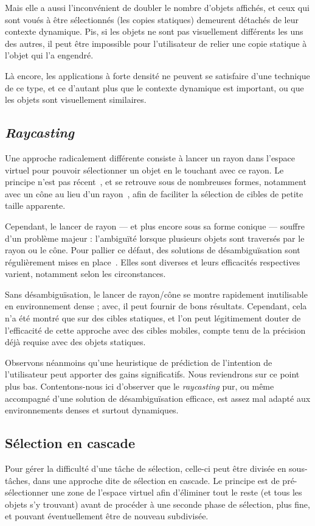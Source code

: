     Mais elle a aussi l'inconvénient de doubler le nombre d'objets affichés, et ceux qui sont voués à être sélectionnés (les copies statiques) demeurent détachés de leur contexte dynamique. Pis, si les objets ne sont pas visuellement différents les uns des autres, il peut être impossible pour l'utilisateur de relier une copie statique à l'objet qui l'a engendré.
    
    Là encore, les applications à forte densité ne peuvent se satisfaire d'une technique de ce type, et ce d'autant plus que le contexte dynamique est important, ou que les objets sont visuellement similaires.
    
    \subsection{\emph{Raycasting}}
    Une approche radicalement différente consiste à lancer un rayon dans l'espace virtuel pour pouvoir sélectionner un objet en le \og touchant \fg{} avec ce rayon. Le principe n'est pas récent~\cite{liang1994jdcad}, et se retrouve sous de nombreuses formes, notamment avec un cône au lieu d'un rayon~\cite{steed20043d}, afin de faciliter la sélection de cibles de petite taille apparente.
    
    Cependant, le lancer de rayon --- et plus encore sous sa forme conique --- souffre d'un problème majeur : l'ambiguïté lorsque plusieurs objets sont traversés par le rayon ou le cône. Pour pallier ce défaut, des solutions de désambiguïsation sont régulièrement mises en place~\cite{grossman2006design}. Elles sont diverses et leurs efficacités respectives varient, notamment selon les circonstances.
    
    Sans désambiguïsation, le lancer de rayon/cône se montre rapidement inutilisable en environnement dense ; avec, il peut fournir de bons résultats. Cependant, cela n'a été montré que sur des cibles statiques, et l'on peut légitimement douter de l'efficacité de cette approche avec des cibles mobiles, compte tenu de la précision déjà requise avec des objets statiques.
    
    Observons néanmoins qu'une heuristique de prédiction de l'intention de l'utilisateur peut apporter des gains significatifs. Nous reviendrons sur ce point plus bas. Contentons-nous ici d'observer que le \emph{raycasting} pur, ou même accompagné d'une solution de désambiguïsation efficace, est assez mal adapté aux environnements denses et surtout dynamiques.
    
    \subsection{Sélection en cascade}
    Pour gérer la difficulté d'une tâche de sélection, celle-ci peut être divisée en sous-tâches, dans une approche dite de sélection en cascade. Le principe est de pré-sélectionner une zone de l'espace virtuel afin d'éliminer tout le reste (et tous les objets s'y trouvant) avant de procéder à une seconde phase de sélection, plus fine, et pouvant éventuellement être de nouveau subdivisée.
    
